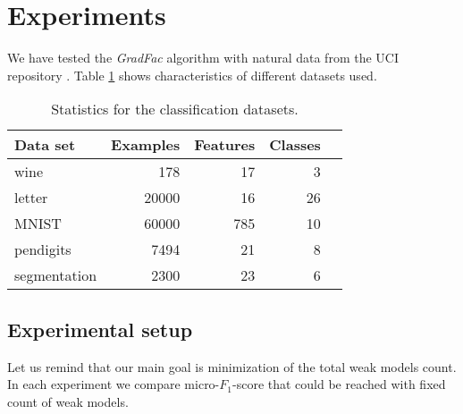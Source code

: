 \documentclass{article}
\begin{document}
\section{Experiments} \label{experiments}
We have tested the \emph{GradFac} algorithm with natural data from the UCI repository \cite{uciRepo}. Table \ref{datasets} shows characteristics of different datasets used.

\begin{table}[t]
\caption{Statistics for the classification datasets.}
\label{datasets}
\vskip 0.15in
\begin{center}
\begin{small}
\begin{sc}
\begin{tabular}{lrrrr}
\hline
\abovespace\belowspace
Data set & Examples & Features & Classes \\
\hline
\abovespace
wine     		& 178 	& 17 	& 3     \\
letter    		& 20000 & 16 	& 26 	\\
MNIST     		& 60000 & 785 	& 10    \\
pendigits 		& 7494 	& 21 	& 8 	\\
segmentation    & 2300 	& 23 	& 6     \\
\hline
\end{tabular}
\end{sc}
\end{small}
\end{center}
\vskip -0.1in
\end{table}


 
\subsection{Experimental setup}
Let us remind that our main goal is minimization of the total weak models count. In each experiment we compare micro-$F_1$-score that could be reached with fixed count of weak models. 
\end{document}
